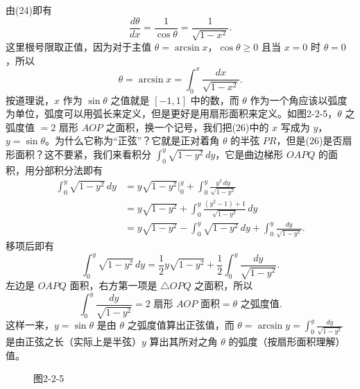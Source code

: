 由(24)即有
\[
\frac{d\theta}{dx}=\frac1{\cos\theta}=\frac1{\sqrt{1-x^2}}. \tag{25}
\]
这里根号限取正值，因为对于主值 $\theta=\arcsin x$，$\cos\theta\ge0$ 且当 $x=0$ 时 $\theta=0$，所以
\[
\theta=\arcsin x=\int_0^x\frac{dx}{\sqrt{1-x^2}}. \tag{26}
\]
按道理说，$x$ 作为 $\sin\theta$ 之值就是 $[-1,1]$ 中的数，而 $\theta$ 作为一个角应该以弧度为单位，弧度可以用弧长来定义，但是更好是用扇形面积来定义。如图2-2-5，$\theta$ 之弧度值 $=2$ 扇形 $AOP$ 之面积，换一个记号，我们把(26)中的 $x$ 写成为 $y$，$y=\sin\theta$。为什么它称为“正弦”？它就是正对着角 $\theta$ 的半弦 $PR$，但是(26)是否扇形面积？这不要紧，我们来看积分 $\int_0^y\sqrt{1-y^2}\,dy$，它是曲边梯形 $OAPQ$ 的面积，用分部积分法即有
\[
\begin{aligned}
\int_0^y\sqrt{1-y^2}\,dy
&=y\sqrt{1-y^2}\big|_0^y+\int_0^y\frac{y^2\,dy}{\sqrt{1-y^2}}\\
&=y\sqrt{1-y^2}+\int_0^y\frac{(y^2-1)+1}{\sqrt{1-y^2}}\,dy\\
&=y\sqrt{1-y^2}-\int_0^y\sqrt{1-y^2}\,dy+\int_0^y\frac{dy}{\sqrt{1-y^2}}.
\end{aligned}
\]
移项后即有
\[
\int_0^y\sqrt{1-y^2}\,dy
=\frac12y\sqrt{1-y^2}+\frac12\int_0^y\frac{dy}{\sqrt{1-y^2}}.
\]
左边是 $OAPQ$ 面积，右方第一项是 $\triangle OPQ$ 之面积，所以
\[
\int_0^y\frac{dy}{\sqrt{1-y^2}}=2\text{ 扇形 }AOP\text{ 面积}=\theta\text{ 之弧度值}.
\]
这样一来，$y=\sin\theta$ 是由 $\theta$ 之弧度值算出正弦值，而 $\theta=\arcsin y=\int_0^y\frac{dy}{\sqrt{1-y^2}}$ 是由正弦之长（实际上是半弦）$y$ 算出其所对之角 $\theta$ 的弧度（按扇形面积理解）值。

\begin{figure}[htbp]
\centering
{}
\caption*{图2-2-5}
\end{figure}

